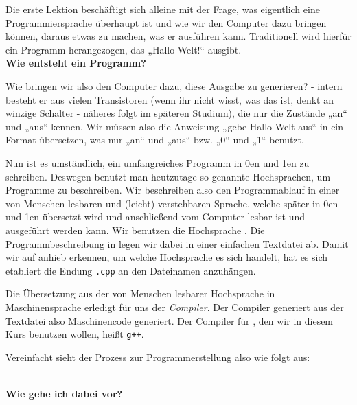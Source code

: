 
Die erste Lektion beschäftigt sich alleine mit der Frage, was eigentlich eine
Programmiersprache überhaupt ist und wie wir den Computer dazu bringen können,
daraus etwas zu machen, was er ausführen kann.
Traditionell wird hierfür ein Programm herangezogen, das „Hallo Welt!“ ausgibt. \\


\textbf{Wie entsteht ein Programm?}

Wie bringen wir also den Computer dazu, diese Ausgabe zu generieren? - intern besteht er aus
vielen Transistoren (wenn ihr nicht wisst, was das ist, denkt an winzige
Schalter - näheres folgt im späteren Studium), die nur die Zustände „an“ und „aus“ kennen.
Wir müssen also die Anweisung „gebe Hallo Welt aus“ in ein Format übersetzen, was nur „an“ und
„aus“ bzw. „0“ und „1“ benutzt.

Nun ist es umständlich, ein umfangreiches Programm in 0en und 1en zu schreiben. Deswegen benutzt man
heutzutage so genannte Hochsprachen, um Programme zu beschreiben. Wir
beschreiben also den Programmablauf in einer von Menschen lesbaren und
(leicht) verstehbaren Sprache, welche später in 0en und 1en übersetzt wird und anschließend vom Computer lesbar ist und ausgeführt werden kann.
Wir benutzen die Hochsprache \Cpp. Die Programmbeschreibung in
\Cpp legen wir dabei in einer einfachen Textdatei ab. Damit wir auf anhieb erkennen, um welche Hochsprache es sich handelt, hat es sich etabliert die Endung
\texttt{.cpp} an den Dateinamen anzuhängen.

Die Übersetzung aus der von Menschen lesbarer Hochsprache in Maschinensprache erledigt für uns der \emph{Compiler}.
Der Compiler generiert aus der Textdatei also Maschinencode generiert. Der Compiler für \Cpp, den wir in diesem Kurs
benutzen wollen, heißt \texttt{g++}.

Vereinfacht sieht der Prozess zur Programmerstellung also wie folgt aus:

 \\

\textbf{Wie gehe ich dabei vor?}

